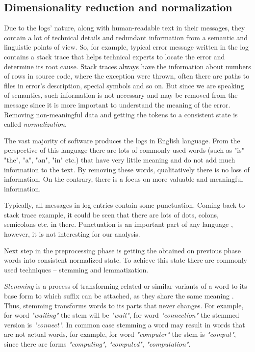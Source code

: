 \documentclass[thesis=M,english]{FITthesis}[2019/12/23]
\begin{document}
\subsection{Dimensionality reduction and normalization}
Due to the logs' nature, along with human-readable text in their messages, they contain a lot of technical details and redundant information from a semantic and linguistic points of view. So, for example, typical error message written in the log contains a stack trace that helps technical experts to locate the error and determine its root cause. Stack traces always have the information about numbers of rows in source code, where the exception were thrown, often there are paths to files in error's description, special symbols and so on. But since we are speaking of semantics, such information is not necessary and may be removed from the message since it is more important to understand the meaning of the error. Removing non-meaningful data and getting the tokens to a consistent state is called \textit{normalization}.  

The vast majority of software produces the logs in English language. From the perspective of this language there are lots of commonly used words (such as "is" "the", "a", "an", "in" etc.) that have very little meaning and do not add much information to the text. By removing these words, qualitatively there is no loss of information. On the contrary, there is a focus on more valuable and meaningful information.

Typically, all messages in log entries contain some punctuation. Coming back to stack trace example, it could be seen that there are lots of dots, colons, semicolons etc. in there. Punctuation is an important part of any language , however, it is not interesting for our analysis.

Next step in the preprocessing phase is getting the obtained on previous phase words into consistent normalized state. To achieve this state there are commonly used techniques -- stemming and lemmatization.

\textit{Stemming} is a process of transforming related or similar variants of a word to its base form to which suffix can be attached, as they share the same meaning \cite{stemming-def}. Thus, stemming transforms words to its parts that never changes. For example, for word \textit{"waiting"} the stem will be \textit{"wait"}, for word \textit{"connection"} the stemmed version is \textit{"connect"}. In common case stemming a word may result in words that are not actual words, for example, for word \textit{"computer"} the stem is \textit{"comput"}, since there are forms \textit{"computing"}, \textit{"computed"}, \textit{"computation"}.
\end{document}
